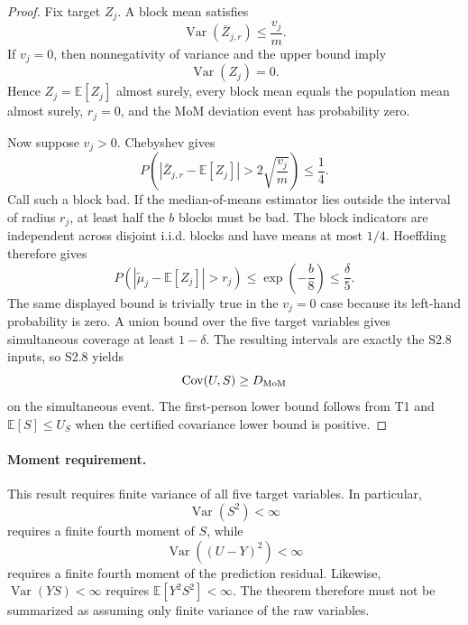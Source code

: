 \begin{proof}
Fix target $Z_j$. A block mean satisfies
\[
\operatorname{Var}(\bar Z_{j,r})
\le\frac{v_j}{m}.
\]
If $v_j=0$, then nonnegativity of variance and the upper bound imply
\[
\operatorname{Var}(Z_j)=0.
\]
Hence $Z_j=\mathbb E[Z_j]$ almost surely, every block mean equals the population mean almost surely, $r_j=0$, and the MoM deviation event has probability zero.

Now suppose $v_j>0$. Chebyshev gives
\[
P\!\left(
|\bar Z_{j,r}-\mathbb E[Z_j]|>
2\sqrt{\frac{v_j}{m}}
\right)
\le\frac14.
\]
Call such a block bad. If the median-of-means estimator lies outside the interval of radius $r_j$, at least half the $b$ blocks must be bad. The block indicators are independent across disjoint i.i.d. blocks and have means at most $1/4$. Hoeffding therefore gives
\[
P\!\left(
|\widetilde\mu_j-\mathbb E[Z_j]|>r_j
\right)
\le
\exp\left(-\frac{b}{8}\right)
\le
\frac{\delta}{5}.
\]
The same displayed bound is trivially true in the $v_j=0$ case because its left-hand probability is zero. A union bound over the five target variables gives simultaneous coverage at least $1-\delta$. The resulting intervals are exactly the S2.8 inputs, so S2.8 yields
\[
\operatorname{Cov}(U,S)
\ge D_{\rm MoM}
\]
on the simultaneous event. The first-person lower bound follows from T1 and $\mathbb E[S]\le U_S$ when the certified covariance lower bound is positive.
\end{proof}

\paragraph{Moment requirement.}
This result requires finite variance of all five target variables. In particular,
\[
\operatorname{Var}(S^2)<\infty
\]
requires a finite fourth moment of $S$, while
\[
\operatorname{Var}((U-Y)^2)<\infty
\]
requires a finite fourth moment of the prediction residual. Likewise, $\operatorname{Var}(YS)<\infty$ requires $\mathbb E[Y^2S^2]<\infty$. The theorem therefore must not be summarized as assuming only finite variance of the raw variables.
